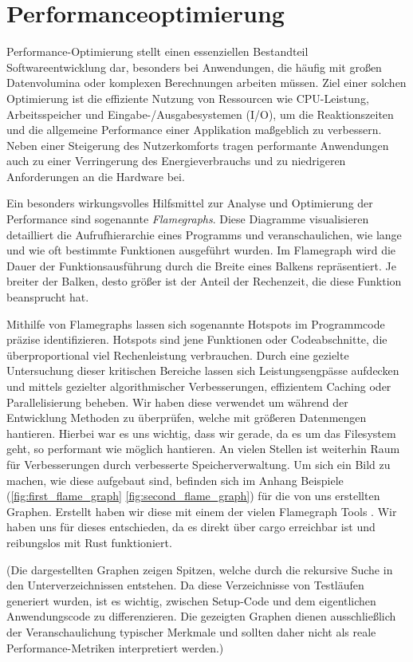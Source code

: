 \section{Performanceoptimierung}\label{sec:Performanceoptimierung}

Performance-Optimierung stellt einen essenziellen Bestandteil Softwareentwicklung dar, besonders bei Anwendungen, die
häufig mit großen Datenvolumina oder komplexen Berechnungen arbeiten müssen. Ziel einer solchen Optimierung ist die effiziente
Nutzung von Ressourcen wie CPU-Leistung, Arbeitsspeicher und Eingabe-/Ausgabesystemen (I/O), um die Reaktionszeiten und die
allgemeine Performance einer Applikation maßgeblich zu verbessern. Neben einer Steigerung des Nutzerkomforts tragen performante
Anwendungen auch zu einer Verringerung des Energieverbrauchs und zu niedrigeren Anforderungen an die Hardware bei.

Ein besonders wirkungsvolles Hilfsmittel zur Analyse und Optimierung der Performance sind sogenannte \textit{Flamegraphs}. Diese
Diagramme visualisieren detailliert die Aufrufhierarchie eines Programms und veranschaulichen, wie lange und wie oft bestimmte
Funktionen ausgeführt wurden. Im Flamegraph wird die Dauer der Funktionsausführung durch die Breite eines Balkens repräsentiert.
Je breiter der Balken, desto größer ist der Anteil der Rechenzeit, die diese Funktion beansprucht hat.

Mithilfe von Flamegraphs lassen sich sogenannte Hotspots im Programmcode präzise identifizieren. Hotspots sind jene Funktionen
oder Codeabschnitte, die überproportional viel Rechenleistung verbrauchen. Durch eine gezielte Untersuchung dieser kritischen
Bereiche lassen sich Leistungsengpässe aufdecken und mittels gezielter algorithmischer Verbesserungen, effizientem Caching oder
Parallelisierung beheben. Wir haben diese verwendet um während der Entwicklung Methoden zu überprüfen, welche mit größeren
Datenmengen hantieren. Hierbei war es uns wichtig, dass wir gerade, da es um das Filesystem geht, so performant wie möglich
hantieren. An vielen Stellen ist weiterhin Raum für Verbesserungen durch verbesserte Speicherverwaltung. Um sich ein Bild zu
machen, wie diese aufgebaut sind, befinden sich im Anhang Beispiele (\ref{fig:first_flame_graph} \ref{fig:second_flame_graph}) für
die von uns erstellten Graphen. Erstellt haben wir diese mit einem der vielen Flamegraph Tools \cite{flamegraph_rs}. Wir haben uns
für dieses entschieden, da es direkt über cargo erreichbar ist und reibungslos mit Rust funktioniert. 

(Die dargestellten Graphen zeigen Spitzen, welche durch die rekursive Suche in den Unterverzeichnissen entstehen. Da diese
Verzeichnisse von Testläufen generiert wurden, ist es wichtig, zwischen Setup-Code und dem eigentlichen Anwendungscode zu
differenzieren. Die gezeigten Graphen dienen ausschließlich der Veranschaulichung typischer Merkmale und sollten daher nicht als
reale Performance-Metriken interpretiert werden.)
